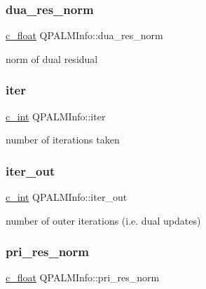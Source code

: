\subsubsection{\texorpdfstring{dua\_res\_norm}{dua\_res\_norm}}
{\footnotesize\ttfamily \mbox{\hyperlink{global__opts_8h_a7f1a9fda95e52979658c20a0d134fb15}{c\+\_\+float}} Q\+P\+A\+L\+M\+Info\+::dua\+\_\+res\+\_\+norm}



norm of dual residual 

\mbox{\label{structQPALMInfo_a37deb2f191ee74eb42877aff5d31e44c}} 
\subsubsection{\texorpdfstring{iter}{iter}}
{\footnotesize\ttfamily \mbox{\hyperlink{global__opts_8h_aa3217a0f49d3e52b74e9dd830c44472f}{c\+\_\+int}} Q\+P\+A\+L\+M\+Info\+::iter}



number of iterations taken 

\mbox{\label{structQPALMInfo_a10f2f0fd44923bdcc22951f9de27d391}} 
\subsubsection{\texorpdfstring{iter\_out}{iter\_out}}
{\footnotesize\ttfamily \mbox{\hyperlink{global__opts_8h_aa3217a0f49d3e52b74e9dd830c44472f}{c\+\_\+int}} Q\+P\+A\+L\+M\+Info\+::iter\+\_\+out}



number of outer iterations (i.\+e. dual updates) 

\mbox{\label{structQPALMInfo_a21e0db7fa16ec32656953c375dc01e3c}} 
\subsubsection{\texorpdfstring{pri\_res\_norm}{pri\_res\_norm}}
{\footnotesize\ttfamily \mbox{\hyperlink{global__opts_8h_a7f1a9fda95e52979658c20a0d134fb15}{c\+\_\+float}} Q\+P\+A\+L\+M\+Info\+::pri\+\_\+res\+\_\+norm}



